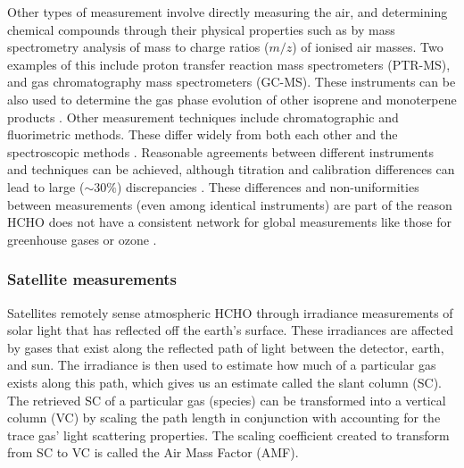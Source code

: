     
    Other types of measurement involve directly measuring the air, and determining chemical compounds through their physical properties such as by mass spectrometry analysis of mass to charge ratios ($m/z$) of ionised air masses.
    Two examples of this include proton transfer reaction mass spectrometers (PTR-MS), and gas chromatography mass spectrometers (GC-MS).
    These instruments can be also used to determine the gas phase evolution of other isoprene and monoterpene products \parencite[eg.][]{Lee2006a,Nguyen2014,Wolfe2016,Lerner2017}.
    Other measurement techniques include chromatographic and fluorimetric methods.
    These differ widely from both each other and the spectroscopic methods \parencite{Hak2005}.
    Reasonable agreements between different instruments and techniques can be achieved, although titration and calibration differences can lead to large ($\sim 30\%$) discrepancies \parencite[e.g.][]{Hak2005}.
    These differences and non-uniformities between measurements (even among identical instruments) are part of the reason HCHO does not have a consistent network for global measurements like those for greenhouse gases or ozone \parencite{FortemsCheiney2012}.
  
    \subsubsection{Satellite measurements}
      \label{LR:HCHO:Sat}
      
      Satellites remotely sense atmospheric HCHO through irradiance measurements of solar light that has reflected off the earth's surface. 
      These irradiances are affected by gases that exist along the reflected path of light between the detector, earth, and sun. 
      The irradiance is then used to estimate how much of a particular gas exists along this path, which gives us an estimate called the slant column (SC).
      The retrieved SC of a particular gas (species) can be transformed into a vertical column (VC) by scaling the path length in conjunction with accounting for the trace gas' light scattering properties.
      The scaling coefficient created to transform from SC to VC is called the Air Mass Factor (AMF).
      
